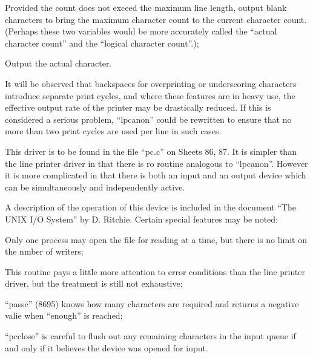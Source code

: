 \item[8954:] Provided the
count does not exceed the maximum
line length, output blank characters to
bring the maximum character count to the
current character count. (Perhaps these two
variables would be more accurately called the
``actual character count'' and the ``logical character count''.);

\item[8959:] Output the actual character.
\ed


It will be observed that backspaces for
overprinting or underscoring characters
introduce separate print cycles, and
where these features are in heavy use,
the effective output rate of the
printer may be drastically reduced. If
this is considered a serious problem,
``lpcanon'' could be rewritten to ensure
that no more than two print cycles are
used per line in such cases.


This driver is to be found in the file
``pc.c'' on Sheets 86, 87. It is simpler
than the line printer driver in that
there is ro routine analogous to
``lpcanon''. However it is more complicated in that there is both an input
and an output device which can be
simultaneously and independently
active.

A description of the operation of this
device is included in the document ``The
UNIX I/O System'' by D. Ritchie. Certain
special features may be noted:

\bd
\item[(1)] Only one process may open the file
for reading at a time, but there is no
limit on the nmber of writers;

\item[(2)] This routine pays a little more
attention to error conditions than the
line printer driver, but the treatment
is still not exhaustive;

\item[(3)] ``passc'' (8695) knows how many
characters are required and returns a
negative valie when ``enough'' is
reached;

\item[(4)] ``pcclose'' is careful to flush out
any remaining characters in the input
queue if and only if it believes the
device was opened for input.
\ed
